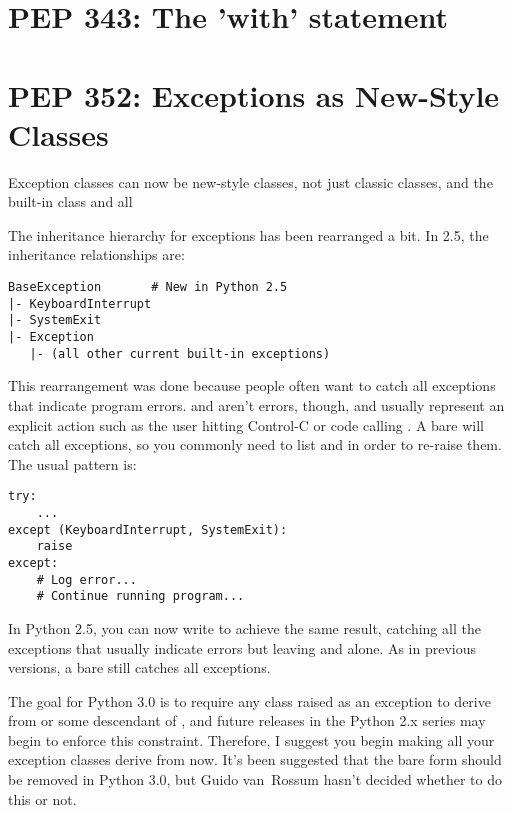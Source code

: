 \documentclass{howto}
\begin{document}
\section{PEP 343: The 'with' statement}



\section{PEP 352: Exceptions as New-Style Classes}

Exception classes can now be new-style classes, not just classic classes,
and the built-in  class and all

The inheritance hierarchy for exceptions has been rearranged a bit.
In 2.5, the inheritance relationships are:

\begin{verbatim}
BaseException       # New in Python 2.5
|- KeyboardInterrupt
|- SystemExit
|- Exception
   |- (all other current built-in exceptions)
\end{verbatim}

This rearrangement was done because people often want to catch all
exceptions that indicate program errors.   and
 aren't errors, though, and usually represent an explicit
action such as the user hitting Control-C or code calling
.  A bare  will catch all exceptions,
so you commonly need to list  and
 in order to re-raise them.  The usual pattern is:

\begin{verbatim}
try:
    ...
except (KeyboardInterrupt, SystemExit):
    raise
except: 
    # Log error...  
    # Continue running program...
\end{verbatim}

In Python 2.5, you can now write  to achieve
the same result, catching all the exceptions that usually indicate errors 
but leaving  and
 alone.  As in previous versions,
a bare  still catches all exceptions.

The goal for Python 3.0 is to require any class raised as an exception
to derive from  or some descendant of
, and future releases in the
Python 2.x series may begin to enforce this constraint.  Therefore, I
suggest you begin making all your exception classes derive from
 now.  It's been suggested that the bare
 form should be removed in Python 3.0, but Guido van~Rossum
hasn't decided whether to do this or not.
\end{document}
